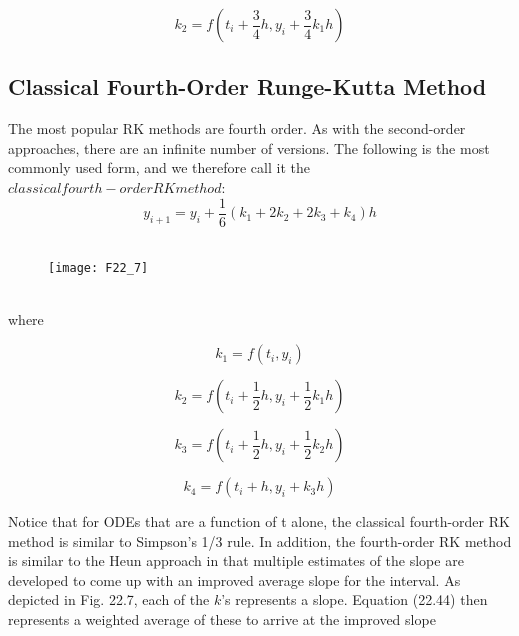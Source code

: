 \documentclass[../main.tex]{subfiles}
\begin{document}
\begin{equation}
\tag{22.43b}
k_2 = f \left(t_i + \dfrac{3}{4}h, y_i + \dfrac{3}{4}k_1h \right)
\end{equation}
 
 \subsection{Classical Fourth-Order Runge-Kutta Method}

 The most popular RK methods are fourth order. As with the second-order approaches, there
are an infinite number of versions. The following is the most commonly used form, and we
therefore call it the $classical fourth-order RK method$:
\begin{equation}
\tag{22.44}
y_{i+1} = y_i + \dfrac{1}{6} (k_1 + 2k_2 + 2k_3 + k_4)h
\end{equation}
\\
\begin{figure}[hbt!]
	\texttt{[image: F22\_7]}
	\label{F22.7}
\end{figure}\\
 where

\begin{equation}
\tag{22.44a}
k_1 = f(t_i, y_i)
\end{equation}

\begin{equation}
\tag{22.44b}
k_2 = f \left(t_i + \dfrac{1}{2}h, y_i + \dfrac{1}{2} k_1h \right)
\end{equation}

\begin{equation}
\tag{22.44c}
k_3 = f \left(t_i + \dfrac{1}{2}h, y_i + \dfrac{1}{2} k_2h \right)
\end{equation}

\begin{equation}
\tag{22.44d}
k_4 = f(t_i + h, y_i + k_3h)
\end{equation}

Notice that for ODEs that are a function of t alone, the classical fourth-order RK
method is similar to Simpson's 1/3 rule. In addition, the fourth-order RK method is similar to the Heun approach in that multiple estimates of the slope are developed to come up
with an improved average slope for the interval. As depicted in Fig. 22.7, each of the $k$'s represents a slope. Equation (22.44) then represents a weighted average of these to arrive
at the improved slope\\
\end{document}
